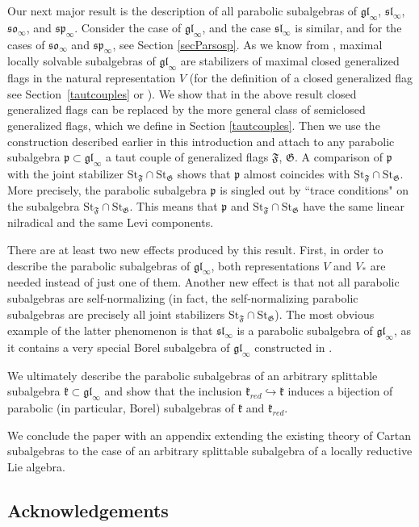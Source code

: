 \documentclass{article}
\newcommand {\St} {\mathrm{St}}
\def\gl{\mathfrak {gl}}
\def\p{\mathfrak {p}}
\def\sl{\mathfrak{sl}}
\def\so{\mathfrak{so}}
\def\sp{\mathfrak{sp}}
\def\k{\mathfrak{k}}
\def\F{\mathfrak{F}}
\def\G{\mathfrak{G}}
\begin{document}
Our next major result is the description of all parabolic subalgebras of $\gl_\infty$, $\sl_\infty$, $\so_\infty$, and $\sp_\infty$. Consider the case of $\gl_\infty$, and the case $\sl_\infty$ is similar, and for the cases of $\so_\infty$ and $\sp_\infty$, see Section \ref{secParsosp}. As we know from \cite{DP2}, maximal locally solvable subalgebras of $\gl_\infty$ are stabilizers of maximal closed generalized flags in the natural representation $V$ (for the definition of a closed generalized flag see Section~\ref{tautcouples} or \cite{DP2}). We show that in the above result closed generalized flags can be replaced by the more general class of semiclosed generalized flags, which we define in Section \ref{tautcouples}. Then we use the construction described earlier in this introduction and attach to any parabolic subalgebra $\p\subset\gl_\infty$ a taut couple of generalized flags $\F$, $\G$. A comparison of $\p$ with the joint stabilizer $\St_\F\cap \St_\G$ shows that $\p$ almost coincides with $\St_\F \cap \St_\G$. More precisely, the parabolic subalgebra $\p$ is singled out by ``trace conditions" on the subalgebra  $\St_\F \cap \St_\G$. This means that $\p$ and $\St_\F \cap \St_\G$ have the same linear nilradical and the same Levi components. 

There are at least two new effects produced by this result.  First, in order to describe the parabolic subalgebras of $\gl_\infty$, both representations $V$ and $V_*$ are needed instead of just one of them.  Another new effect is that not all parabolic subalgebras are self-normalizing (in fact, the self-normalizing parabolic subalgebras are precisely all joint stabilizers $\St_\F \cap \St_\G$). The most obvious example of the latter phenomenon is that $\sl_\infty$ is a parabolic subalgebra of $\gl_\infty$, as it contains a very special Borel subalgebra of $\gl_\infty$ constructed in \cite{DP2}.

We ultimately describe the parabolic subalgebras of an arbitrary splittable subalgebra $\k \subset \gl_\infty$ and show that the inclusion $\k_{red} \hookrightarrow \k$ induces a bijection of parabolic (in particular, Borel) subalgebras of $\k$ and $\k_{red}$. 

We conclude the paper with an appendix extending the existing theory of Cartan subalgebras to the case of an arbitrary splittable subalgebra of a locally reductive Lie algebra. 

\subsection*{Acknowledgements}
\end{document}
